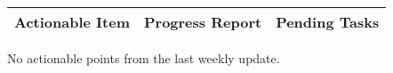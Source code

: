 \begin{table}[!h]
    \centering
    \begin{tabularx}{\textwidth}{|X|X|X|}
        \hline
        Actionable Item & Progress Report & Pending Tasks \\
        \hline
        \hline
    \end{tabularx}
\end{table}

No actionable points from the last weekly update.